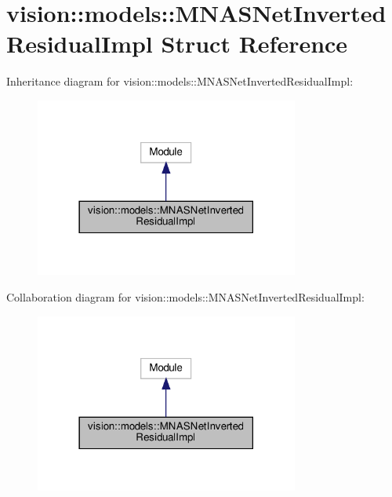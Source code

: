 \hypertarget{structvision_1_1models_1_1MNASNetInvertedResidualImpl}{}\section{vision\+:\+:models\+:\+:M\+N\+A\+S\+Net\+Inverted\+Residual\+Impl Struct Reference}
\label{structvision_1_1models_1_1MNASNetInvertedResidualImpl}


Inheritance diagram for vision\+:\+:models\+:\+:M\+N\+A\+S\+Net\+Inverted\+Residual\+Impl\+:
\nopagebreak
\begin{figure}[H]
\begin{center}
\leavevmode
\includegraphics[width=246pt]{structvision_1_1models_1_1MNASNetInvertedResidualImpl__inherit__graph}
\end{center}
\end{figure}


Collaboration diagram for vision\+:\+:models\+:\+:M\+N\+A\+S\+Net\+Inverted\+Residual\+Impl\+:
\nopagebreak
\begin{figure}[H]
\begin{center}
\leavevmode
\includegraphics[width=246pt]{structvision_1_1models_1_1MNASNetInvertedResidualImpl__coll__graph}
\end{center}
\end{figure}
